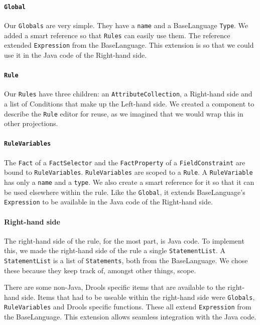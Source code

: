 \paragraph{\texttt{Global}} Our \texttt{Globals} are very simple.
They have a \texttt{name} and a BaseLanguage \texttt{Type}.
We added a smart reference so that \texttt{Rules} can easily use them.
The reference extended \texttt{Expression} from the BaseLanguage.
This extension is so that we could use it in the Java code of the Right-hand side.

\paragraph{\texttt{Rule}} Our \texttt{Rules} have three children: an \texttt{AttributeCollection}, a Right-hand side and a list of Conditions that make up the Left-hand side.
We created a component to describe the \texttt{Rule} editor for reuse, as we imagined that we would wrap this in other projections.

\paragraph{\texttt{RuleVariables}} The \texttt{Fact} of a \texttt{FactSelector} and the \texttt{FactProperty} of a \texttt{FieldConstraint} are bound to \texttt{RuleVariables}.
\texttt{RuleVariables} are scoped to a \texttt{Rule}.
A \texttt{RuleVariable} has only a \texttt{name} and a \texttt{type}.
We also create a smart reference for it so that it can be used elsewhere within the rule.
Like the \texttt{Global}, it extends BaseLanguage's \texttt{Expression} to be available in the Java code of the Right-hand side.

\paragraph{Right-hand side} The right-hand side of the rule, for the most part, is Java code.
To implement this, we made the right-hand side of the rule a single \texttt{StatementList}.
A \texttt{StatementList} is a list of \texttt{Statements}, both from the BaseLanguage.
We chose these because they keep track of, amongst other things, scope.

There are some non-Java, Drools specific items that are available to the right-hand side.
Items that had to be useable within the right-hand side were \texttt{Globals}, \texttt{RuleVariables} and Drools specific functions.
These all extend \texttt{Expression} from the BaseLanguage.
This extension allows seamless integration with the Java code.

